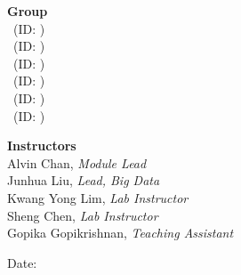 \begin{titlepage}
%
\begin{minipage}[t]{0.48\textwidth}
    \begin{flushleft} \large
        \textbf{Group \gid}\\
        \reportauthorOne~(ID: \cidOne)\\
        \reportauthorTwo~(ID: \cidTwo)\\
        \reportauthorThree~(ID: \cidThree)\\
        \reportauthorFour~(ID: \cidFour)\\
        \reportauthorFive~(ID: \cidFive)\\
        \reportauthorSix~(ID: \cidSix)\\
    \end{flushleft}
\end{minipage}
\hfill
\begin{minipage}[t]{0.48\textwidth}
    \begin{flushright} \large
        \textbf{Instructors}\\
        Alvin Chan, \textit{\small Module Lead}\\
        Junhua Liu, \textit{\small Lead, Big Data}\\
        Kwang Yong Lim, \textit{\small Lab Instructor}\\
        Sheng Chen, \textit{\small Lab Instructor}\\
        Gopika Gopikrishnan, \textit{\small Teaching Assistant}\\
    \end{flushright}
\end{minipage}

\vspace*{\fill}
\begin{center}
    \makeatletter
    Date: \@date
    \makeatother
\end{center}


\end{titlepage}